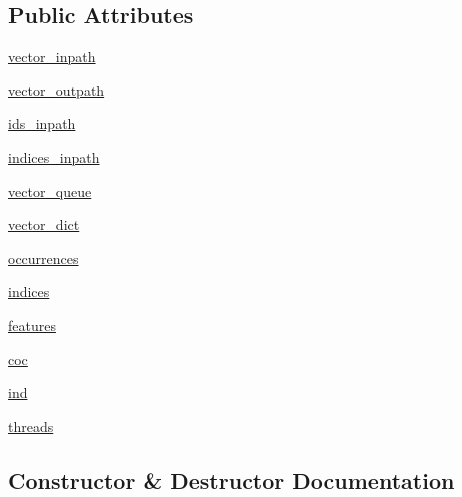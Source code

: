 \subsection*{Public Attributes}
\begin{DoxyCompactItemize}
\item 
\hyperlink{classsrc_1_1mapping_1_1mapthreading_1_1_mapping_master_thread_ad28cd816fab3ea85e9b7f9c105d306a2}{vector\+\_\+inpath}
\item 
\hyperlink{classsrc_1_1mapping_1_1mapthreading_1_1_mapping_master_thread_a38c9150229ea50de973f9f4ce2e6569f}{vector\+\_\+outpath}
\item 
\hyperlink{classsrc_1_1mapping_1_1mapthreading_1_1_mapping_master_thread_ac2d586e34cbeeeb50f653ad0cd0596fa}{ids\+\_\+inpath}
\item 
\hyperlink{classsrc_1_1mapping_1_1mapthreading_1_1_mapping_master_thread_a88fb8c0056df70baf0f4c3fa20d8807e}{indices\+\_\+inpath}
\item 
\hyperlink{classsrc_1_1mapping_1_1mapthreading_1_1_mapping_master_thread_ad7241d90991759aa3f991ac6b3c7262d}{vector\+\_\+queue}
\item 
\hyperlink{classsrc_1_1mapping_1_1mapthreading_1_1_mapping_master_thread_a96d361c570dffb2a12aa2438ea282ff4}{vector\+\_\+dict}
\item 
\hyperlink{classsrc_1_1mapping_1_1mapthreading_1_1_mapping_master_thread_a9590c2f02cc5fbb8b04cea323b9ae51b}{occurrences}
\item 
\hyperlink{classsrc_1_1mapping_1_1mapthreading_1_1_mapping_master_thread_aa2df8eb426374f62553139fee7b107f6}{indices}
\item 
\hyperlink{classsrc_1_1mapping_1_1mapthreading_1_1_mapping_master_thread_a57fe84be32a92ff596ca24b0a7de2324}{features}
\item 
\hyperlink{classsrc_1_1mapping_1_1mapthreading_1_1_mapping_master_thread_afffeaf170582fa3bb01f14ac4037a1f8}{coc}
\item 
\hyperlink{classsrc_1_1mapping_1_1mapthreading_1_1_mapping_master_thread_aec87bfdd4a2d97c8ac2370ca064b57b9}{ind}
\item 
\hyperlink{classsrc_1_1mapping_1_1mapthreading_1_1_mapping_master_thread_a0dc846ca67326784955baccaf10b96bd}{threads}
\end{DoxyCompactItemize}


\subsection{Constructor \& Destructor Documentation}
